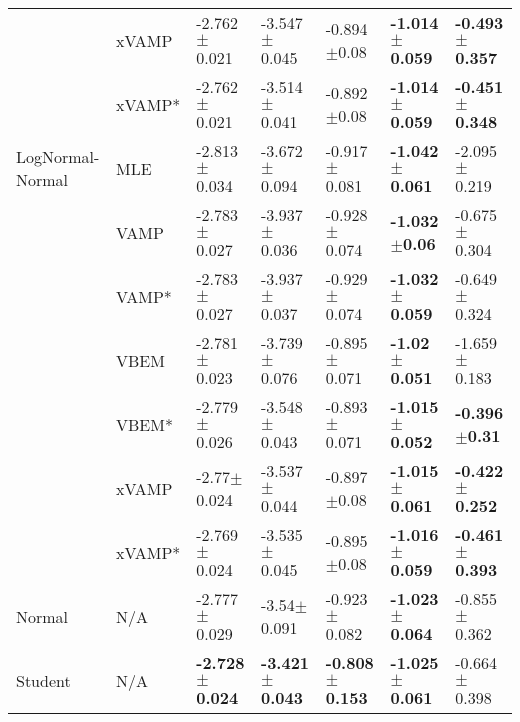 \begin{tabular}{lllllll}
        & xVAMP &           -2.762$\pm$0.021 &           -3.547$\pm$0.045 &            -0.894$\pm$0.08 &  \textbf{-1.014$\pm$0.059} &  \textbf{-0.493$\pm$0.357} \\
        & xVAMP* &           -2.762$\pm$0.021 &           -3.514$\pm$0.041 &            -0.892$\pm$0.08 &  \textbf{-1.014$\pm$0.059} &  \textbf{-0.451$\pm$0.348} \\
LogNormal-Normal & MLE &           -2.813$\pm$0.034 &           -3.672$\pm$0.094 &           -0.917$\pm$0.081 &  \textbf{-1.042$\pm$0.061} &           -2.095$\pm$0.219 \\
        & VAMP &           -2.783$\pm$0.027 &           -3.937$\pm$0.036 &           -0.928$\pm$0.074 &   \textbf{-1.032$\pm$0.06} &           -0.675$\pm$0.304 \\
        & VAMP* &           -2.783$\pm$0.027 &           -3.937$\pm$0.037 &           -0.929$\pm$0.074 &  \textbf{-1.032$\pm$0.059} &           -0.649$\pm$0.324 \\
        & VBEM &           -2.781$\pm$0.023 &           -3.739$\pm$0.076 &           -0.895$\pm$0.071 &   \textbf{-1.02$\pm$0.051} &           -1.659$\pm$0.183 \\
        & VBEM* &           -2.779$\pm$0.026 &           -3.548$\pm$0.043 &           -0.893$\pm$0.071 &  \textbf{-1.015$\pm$0.052} &   \textbf{-0.396$\pm$0.31} \\
        & xVAMP &            -2.77$\pm$0.024 &           -3.537$\pm$0.044 &            -0.897$\pm$0.08 &  \textbf{-1.015$\pm$0.061} &  \textbf{-0.422$\pm$0.252} \\
        & xVAMP* &           -2.769$\pm$0.024 &           -3.535$\pm$0.045 &            -0.895$\pm$0.08 &  \textbf{-1.016$\pm$0.059} &  \textbf{-0.461$\pm$0.393} \\
Normal & N/A &           -2.777$\pm$0.029 &            -3.54$\pm$0.091 &           -0.923$\pm$0.082 &  \textbf{-1.023$\pm$0.064} &           -0.855$\pm$0.362 \\
Student & N/A &  \textbf{-2.728$\pm$0.024} &  \textbf{-3.421$\pm$0.043} &  \textbf{-0.808$\pm$0.153} &  \textbf{-1.025$\pm$0.061} &           -0.664$\pm$0.398 \\
\bottomrule
\end{tabular}

